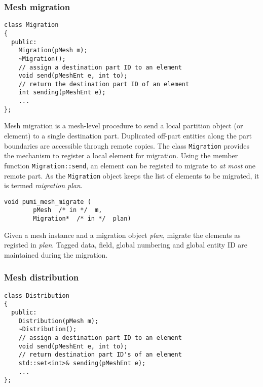 \subsubsection{Mesh migration}

\begin{verbatim}
class Migration
{
  public:
    Migration(pMesh m);
    ~Migration();
    // assign a destination part ID to an element
    void send(pMeshEnt e, int to); 
    // return the destination part ID of an element
    int sending(pMeshEnt e); 
    ...
};
\end{verbatim}\vspace{-.5cm}\hspace{1cm}

Mesh migration is a mesh-level procedure to send a local partition object (or element) to a single destination part. Duplicated off-part entities along the part boundaries are accessible through remote copies. The class \texttt{Migration} provides the mechanism to register a local element for migration. Using the member function \texttt{Migration::send}, an element can be registed to migrate to \emph{at most} one remote part. As the \texttt{Migration} object keeps the list of elements to be migrated, it is termed \emph{migration plan}. 

\begin{verbatim}
void pumi_mesh_migrate (
        pMesh  /* in */  m,
        Migration*  /* in */  plan)
\end{verbatim}\vspace{-.5cm}\hspace{1cm}
Given a mesh instance and a migration object \emph{plan}, migrate the elements as registed in \emph{plan}. Tagged data, field, global numbering and global entity ID are maintained during the migration.

\subsubsection{Mesh distribution}

\begin{verbatim}
class Distribution
{
  public:
    Distribution(pMesh m);
    ~Distribution();
    // assign a destination part ID to an element
    void send(pMeshEnt e, int to); 
    // return destination part ID's of an element
    std::set<int>& sending(pMeshEnt e); 
    ...
};
\end{verbatim}\vspace{-.5cm}\hspace{1cm}

